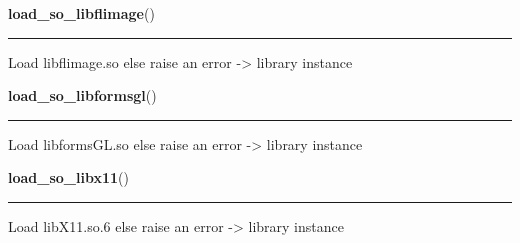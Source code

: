     \label{xformslib:library:load_so_libflimage}

    \vspace{0.5ex}

\hspace{.8\funcindent}\begin{boxedminipage}{\funcwidth}

    \raggedright \textbf{load\_so\_libflimage}()

    \vspace{-1.5ex}

    \rule{\textwidth}{0.5\fboxrule}
\setlength{\parskip}{2ex}
    Load libflimage.so else raise an error -{\textgreater} library instance

\setlength{\parskip}{1ex}
    \end{boxedminipage}

    \label{xformslib:library:load_so_libformsgl}

    \vspace{0.5ex}

\hspace{.8\funcindent}\begin{boxedminipage}{\funcwidth}

    \raggedright \textbf{load\_so\_libformsgl}()

    \vspace{-1.5ex}

    \rule{\textwidth}{0.5\fboxrule}
\setlength{\parskip}{2ex}
    Load libformsGL.so else raise an error -{\textgreater} library instance

\setlength{\parskip}{1ex}
    \end{boxedminipage}

    \label{xformslib:library:load_so_libx11}

    \vspace{0.5ex}

\hspace{.8\funcindent}\begin{boxedminipage}{\funcwidth}

    \raggedright \textbf{load\_so\_libx11}()

    \vspace{-1.5ex}

    \rule{\textwidth}{0.5\fboxrule}
\setlength{\parskip}{2ex}
    Load libX11.so.6 else raise an error -{\textgreater} library instance

\setlength{\parskip}{1ex}
    \end{boxedminipage}


